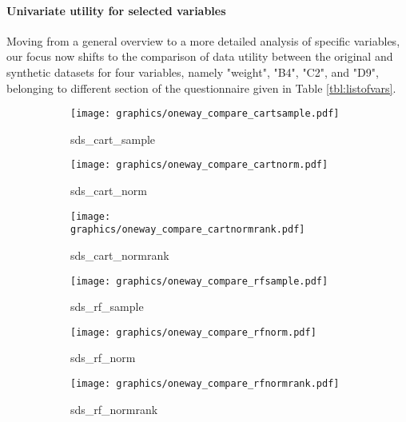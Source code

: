 \paragraph{Univariate utility for selected variables}
Moving from a general overview to a more detailed analysis of specific variables, our focus now shifts to the comparison of data utility between the original and synthetic datasets for four variables, namely "weight", "B4", "C2", and "D9", belonging to different section of the questionnaire given in Table \ref{tbl:listofvars}.
\begin{figure}[H]
\centering
    \begin{subfigure}{0.32\textwidth}
        \centering
        \texttt{[image: graphics/oneway\_compare\_cartsample.pdf]}  
        \caption{sds\_cart\_sample}
        \label{subfig:cartsample}
    \end{subfigure}
    \begin{subfigure}{0.32\textwidth}
        \centering
        \texttt{[image: graphics/oneway\_compare\_cartnorm.pdf]}  
        \caption{sds\_cart\_norm}
        \label{subfig:cartnorm}
    \end{subfigure}
    \begin{subfigure}{0.32\textwidth}
        \centering
        \texttt{[image: graphics/oneway\_compare\_cartnormrank.pdf]}  
        \caption{sds\_cart\_normrank}
        \label{subfig:cartnormrank}
    \end{subfigure}
    \medskip
    \begin{subfigure}{0.32\textwidth}
        \centering
        \texttt{[image: graphics/oneway\_compare\_rfsample.pdf]}  
        \caption{sds\_rf\_sample}
        \label{subfig:rfsample}
    \end{subfigure}
    \begin{subfigure}{0.32\textwidth}
        \centering
        \texttt{[image: graphics/oneway\_compare\_rfnorm.pdf]}  
        \caption{sds\_rf\_norm}
        \label{subfig:rfnorm}
    \end{subfigure}
    \begin{subfigure}{0.32\textwidth}
        \centering
        \texttt{[image: graphics/oneway\_compare\_rfnormrank.pdf]}  
        \caption{sds\_rf\_normrank}
        \label{subfig:rfnormrank}
    \end{subfigure}
    \medskip
    \begin{subfigure}{0.32\textwidth}

\end{subfigure}
\end{figure}
